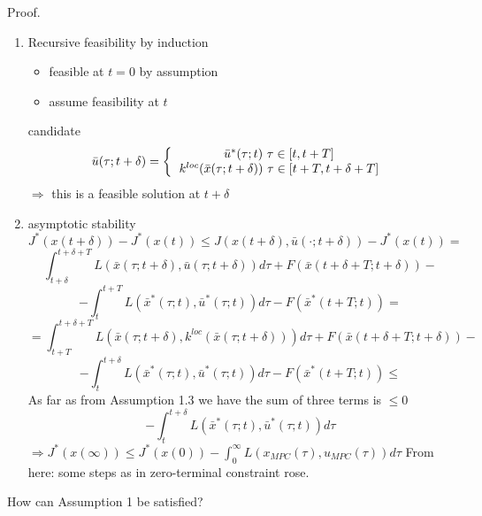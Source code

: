 Proof.
\begin{enumerate}
\item Recursive feasibility by induction 
\begin{itemize}
\item feasible at $t=0$ by assumption
\item assume feasibility at $t$
\end{itemize}
candidate 
\begin{equation*}
\bar u(\tau; t+\delta) =
\left \{
  \begin{tabular}{c}
  $\bar u^*(\tau;t) \ \tau \in [t, t+ T]$ \\
  $k^{loc}(\bar x(\tau;t+\delta)) \ \tau \in [t+T, t+\delta+T]$ 
  \end{tabular}
  \right.
\end{equation*}
$\Rightarrow$ this is a feasible solution at $t+\delta$
\item asymptotic stability
\begin{equation*}
J^*(x(t+\delta)) - J^*(x(t)) \leq J(x(t+\delta), \bar u(\cdot;t+\delta)) - J^*(x(t)) =
\end{equation*}
\begin{equation*}
\int_{t+\delta}^{t+ \delta +T} L(\bar x(\tau;t+\delta), \bar u(\tau;t+\delta)) d\tau + F(\bar x(t+\delta+ T;t+\delta)) -
\end{equation*}
\begin{equation*}
- \int_{t}^{t+T}L(\bar x^*(\tau;t),\bar u^*(\tau;t))d\tau - F(\bar x^*(t+T;t)) =
\end{equation*}
\begin{equation*}
= \int_{t+T}^{t+\delta+T}L(\bar x(\tau;t+\delta), k^{loc}(\bar x(\tau;t+\delta)))d\tau + F(\bar x(t+\delta+T;t+\delta)) -
\end{equation*}
\begin{equation*}
- \int_t^{t+\delta}L(\bar x^*(\tau;t), \bar u^*(\tau;t))d\tau - F(\bar x^*(t+T;t)) \leq
\end{equation*}
As far as from Assumption 1.3 we have the sum of three terms is $\leq 0$
\begin{equation*}
-\int_t^{t+\delta}L(\bar x^*(\tau;t),\bar u^*(\tau;t))d\tau
\end{equation*}
$\Rightarrow J^*(x(\infty)) \leq J^*(x(0)) - \int_0^{\infty}L(x_{MPC}(\tau), u_{MPC}(\tau))d\tau$
From here: some steps as in zero-terminal constraint rose. 
\end{enumerate}

How can Assumption 1 be satisfied?

